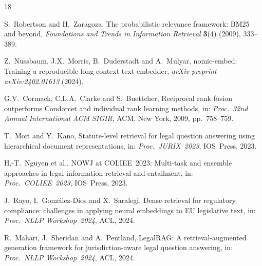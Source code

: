 \documentclass[sigconf,screen]{acmart}
\begin{document}
\begin{thebibliography}{18}


S.~Robertson and H.~Zaragoza,
The probabilistic relevance framework: {BM25} and beyond,
\textit{Foundations and Trends in Information Retrieval}
\textbf{3}(4) (2009), 333--389.

Z.~Nussbaum, J.X.~Morris, B.~Duderstadt and A.~Mulyar,
nomic-embed: Training a reproducible long context text embedder,
\textit{arXiv preprint arXiv:2402.01613} (2024).

G.V.~Cormack, C.L.A.~Clarke and S.~Buettcher,
Reciprocal rank fusion outperforms {C}ondorcet and individual rank
learning methods,
in: \textit{Proc.\ 32nd Annual International ACM SIGIR}, ACM,
New York, 2009, pp.~758--759.


T.~Mori and Y.~Kano,
Statute-level retrieval for legal question answering using
hierarchical document representations,
in: \textit{Proc.\ JURIX~2023}, IOS~Press, 2023.

H.-T.~Nguyen et al.,
{NOWJ} at {COLIEE}~2023: Multi-task and ensemble approaches in legal
information retrieval and entailment,
in: \textit{Proc.\ COLIEE~2023}, IOS~Press, 2023.

J.~Rayo, I.~Gonz\'{a}lez-Dios and X.~Saralegi,
Dense retrieval for regulatory compliance: challenges in applying
neural embeddings to {EU} legislative text,
in: \textit{Proc.\ NLLP Workshop~2024}, ACL, 2024.

R.~Mahari, J.~Sheridan and A.~Pentland,
{LegalRAG}: A retrieval-augmented generation framework for
jurisdiction-aware legal question answering,
in: \textit{Proc.\ NLLP Workshop~2024}, ACL, 2024.



\end{thebibliography}
\end{document}

